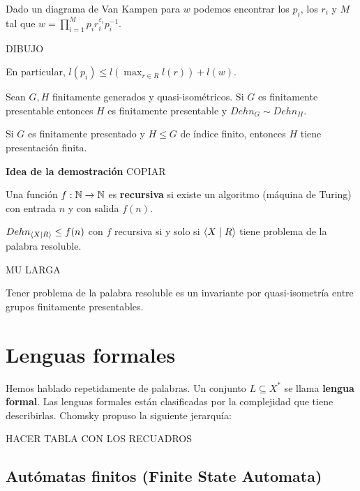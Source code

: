 \documentclass[twoside, 11pt]{article}
\begin{document}
\begin{observacion}
Dado un diagrama de Van Kampen para $w$ podemos encontrar los $p_i$, los $r_i$ y $M$ tal que $w=\prod_{i=1}^M p_i r_i^{\varepsilon_i} p_i^{-1}$.

DIBUJO

En particular, $l(p_i)\leq l(\max_{r\in R} l(r))+l(w)$.
\end{observacion}

\begin{teorema}
Sean $G,H$ finitamente generados y quasi-isométricos. Si $G$ es finitamente presentable entonces $H$ es finitamente presentable y $Dehn_G\sim Dehn_H$.
\end{teorema}

\begin{coro}
Si $G$ es finitamente presentado y $H\leq G$ de índice finito, entonces $H$ tiene presentación finita.
\end{coro}

\textbf{Idea de la demostración}
COPIAR

\begin{defi}
Una función $f:\mathbb{N}\to\mathbb{N}$ es \textbf{recursiva} si existe un algoritmo (máquina de Turing) con entrada $n$ y con salida $f(n)$. 
\end{defi}

\begin{teorema}
$Dehn_{\langle{X\mid R}\rangle}\leq f(n)$ con $f$ recursiva si y solo si $\langle{X\mid R}\rangle$ tiene problema de la palabra resoluble. 
\end{teorema}
\begin{dem}
MU LARGA
\QED
\end{dem}

\begin{coro}
Tener problema de la palabra resoluble es un invariante por quasi-isometría entre grupos finitamente presentables. 
\end{coro}

\section{Lenguas formales}

Hemos hablado repetidamente de palabras. Un conjunto $L\subseteq X^*$ se llama \textbf{lengua formal}. Las lenguas formales están clasificadas por la complejidad que tiene describirlas. Chomsky propuso la siguiente jerarquía:

HACER TABLA CON LOS RECUADROS


\subsection{Autómatas finitos (Finite State Automata)}
\end{document}
